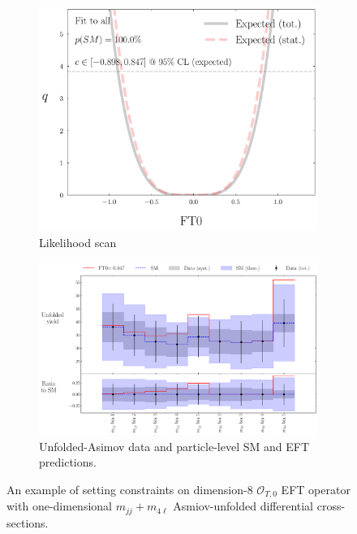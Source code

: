 \begin{figure}[!htbp]
    \centering
    \begin{subfigure}{.49\textwidth}
        \centering
        \includegraphics[width=.8\linewidth]{figures/Results/EFT/Likelihood_profile_FT0_all_SR_SM_fixed.pdf}
        \caption{ Likelihood scan \label{fig:EFT_Example_LikelihoodScan}}
    \end{subfigure}
    \begin{subfigure}{.49\textwidth}
        \centering
        \includegraphics[width=.99\linewidth]{figures/Results/EFT/Unfolded_spectrum_FT0_all_SR_SM_fixed.pdf}
        \caption{ Unfolded-Asimov data and particle-level SM and EFT predictions.\label{fig:EFT_Example_MaxValue} }
    \end{subfigure}
    \caption{ An example of setting constraints on dimension-8 $\mathcal{O}_{T,0}$ EFT operator with one-dimensional $m_{jj}+m_{4\ell}$ Asmiov-unfolded differential cross-sections.  \label{fig:EFT_Example}}
\end{figure}


